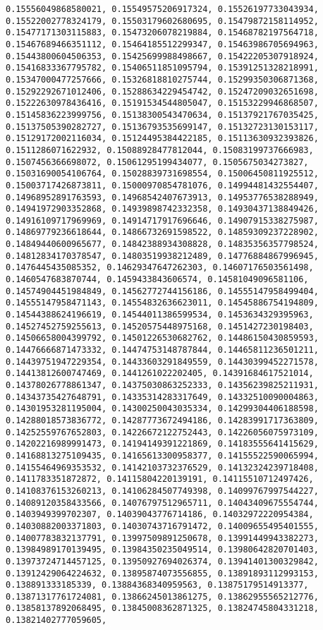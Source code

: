 \documentclass[11pt]{article}
\begin{document}
\begin{Verbatim}[commandchars=\\\{\}]
0.15556049868580021, 0.15549575206917324, 0.15526197733043934, 0.15522002778324179, 0.15503179602680695, 0.15479872158114952, 0.15477171303115883, 0.15473206078219884, 0.15468782197564718, 0.15467689466351112, 0.15464185512299347, 0.15463986705694963, 0.15443800604506353, 0.15425699988498667, 0.15422205307918924, 0.15416833367795782, 0.15406511851095794, 0.15391251328218991, 0.15347000477257666, 0.15326818810275744, 0.15299350306871368, 0.15292292671012406, 0.15288634229454742, 0.15247209032651698, 0.15222630978436416, 0.15191534544805047, 0.15153229946868507, 0.15145836223999756, 0.15138300543470634, 0.15137921767035425, 0.15137505390282727, 0.15136793535699147, 0.15132723130153117, 0.15129172002116034, 0.15124495384422185, 0.15113630932393826, 0.1511286071622932, 0.15088928477812044, 0.15083199737666983, 0.1507456366698072, 0.15061295199434077, 0.1505675034273827, 0.15031690054106764, 0.15028839731698554, 0.15006450811925512, 0.15003717426873811, 0.15000970854781076, 0.14994481432554407, 0.14968952891763593, 0.14968542407673913, 0.14953776538288949, 0.14941972903352868, 0.14939898742332358, 0.14930437138849426, 0.14916109717969969, 0.14914717917696646, 0.14907915338275987, 0.14869779236618644, 0.14866732691598522, 0.14859309237228902, 0.14849440600965677, 0.14842388934308828, 0.14835356357798524, 0.14812834170378547, 0.14803519938212489, 0.14776884867996945, 0.1476445435085352, 0.14629347647262303, 0.14607176503561498, 0.1460547683870744, 0.1459433843606574, 0.14581049096581106, 0.14574904451984849, 0.14562772744156186, 0.14555147958499404, 0.14555147958471143, 0.14554832636623011, 0.14545886754194809, 0.14544388624196619, 0.14544011386599534, 0.1453634329395963, 0.14527452759255613, 0.14520575448975168, 0.1451427230198403, 0.14506658004399792, 0.14501226530682762, 0.14486150430859593, 0.14476666871473332, 0.14474753148787844, 0.14465811236501211, 0.14439751947229354, 0.14433603291849559, 0.14430399452271578, 0.14413812600747469, 0.1441261022202405, 0.14391684617521014, 0.14378026778861347, 0.14375030863252333, 0.14356239825211931, 0.14343735427648791, 0.14335314283317649, 0.14332510090004863, 0.14301953281195004, 0.14300250043035334, 0.14299304406188598, 0.14288018573836772, 0.14287773672494186, 0.14283991717363809, 0.14252559767652803, 0.14226672122752443, 0.14226056075973109, 0.14202216989991473, 0.14194149391221869, 0.14183555641415629, 0.14168813275109435, 0.14165613300958377, 0.14155522590065994, 0.14155464969353532, 0.14142103732376529, 0.14132324239718408, 0.1411783351872872, 0.14115804220139191, 0.14115510712497426, 0.14108376153260213, 0.14106284507749398, 0.14099767997544227, 0.14089120358433566, 0.14076797512965711, 0.14043409675554744, 0.1403949399702307, 0.14039043776714186, 0.14032972220954384, 0.14030882003371803, 0.14030743716791472, 0.14009655495401555, 0.14007783832137791, 0.13997509891250678, 0.13991449943382273, 0.13984989170139495, 0.13984350235049514, 0.13980642820701403, 0.13973724714457125, 0.13950927694026374, 0.13941401300329842, 0.13912429064224632, 0.13895874073556855, 0.13891893112993153, 0.138891333185339, 0.13884368340959563, 0.13875179514913377, 0.13871317761724081, 0.13866245013861275, 0.13862955565212776, 0.13858137892068495, 0.13845008362871325, 0.13824745804331218, 0.13821402777059605, 
\end{Verbatim}
\end{document}
